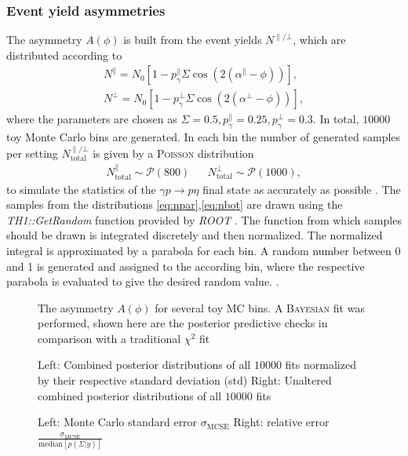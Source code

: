 \subsubsection{Event yield asymmetries}
The asymmetry $A\left(\phi\right)$ is built from the event yields $N^{\parallel/\bot}$, which are distributed according to
\begin{align}
	N^{\parallel}=N_0\left[1-p_\gamma^\parallel\Sigma\cos\left(2\left(\alpha^\parallel-\phi\right)\right)\right],\label{eq:npar}\\
	N^{\bot}=N_0\left[1-p_\gamma^\bot\Sigma\cos\left(2\left(\alpha^\bot-\phi\right)\right)\right],
	\label{eq:nbot}
\end{align}
where the parameters are chosen as $\Sigma=0.5,p_\gamma^\parallel=0.25,p_\gamma^\bot=0.3$. In total, $10000$ toy Monte Carlo bins are generated. In each bin the number of generated samples per setting $N_\text{total}^{\parallel/\bot}$ is given by a \textsc{Poisson} distribution
\begin{align}
N_\text{total}^\parallel \sim \mathcal{P}(800) && N_\text{total}^\bot \sim \mathcal{P}(1000),
\end{align}
to simulate the statistics of the $\gamma p \to p\eta$ final state as accurately as possible \cite{farahphd}. The samples from the distributions \eqref{eq:npar},\eqref{eq:nbot} are drawn using the \emph{TH1::GetRandom} \cite{rrandom} function provided by \emph{ROOT} \cite{root}. The function from which samples should be drawn is integrated discretely and then normalized. The normalized integral is approximated by a parabola for each bin. A random number between 0 and 1 is generated and assigned to the according bin, where the respective parabola is evaluated to give the desired random value. \cite{rrandom}.

\begin{figure}[htbp]
	\caption{The asymmetry $A\left(\phi\right)$ for several toy MC bins. A \textsc{Bayesian} fit was performed, shown here are the posterior predictive checks in comparison with a traditional $\chi^2$ fit}
\end{figure}

\begin{figure}[htbp]
	\caption{Left: Combined posterior distributions of all $10000$ fits normalized by their respective standard deviation (std) Right: Unaltered combined posterior distributions of all $10000$ fits}
\end{figure}

\begin{figure}[htbp]
	\caption{Left: Monte Carlo standard error $\sigma_\text{MCSE}$ Right: relative error $\frac{\sigma_\text{MCSE}}{\text{median}\left[p\left(\Sigma|y\right)\right]}$}
\end{figure}




